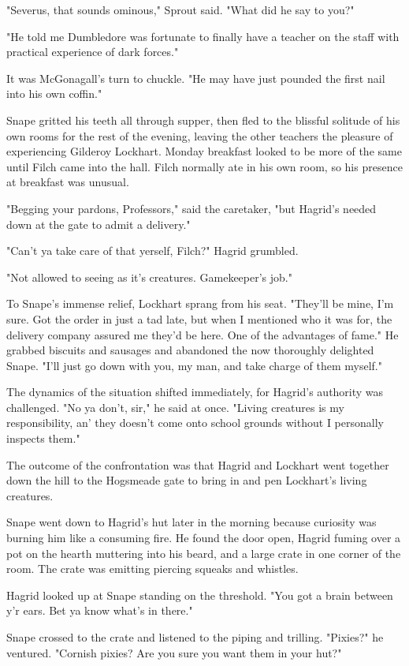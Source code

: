 \documentclass[a4paper,11pt]{article}
\begin{document}
"Severus, that sounds ominous," Sprout said. "What did he say to you?"

"He told me Dumbledore was fortunate to finally have a teacher on the staff with practical experience of dark forces."

It was McGonagall's turn to chuckle. "He may have just pounded the first nail into his own coffin."

Snape gritted his teeth all through supper, then fled to the blissful solitude of his own rooms for the rest of the evening, leaving the other teachers the pleasure of experiencing Gilderoy Lockhart. Monday breakfast looked to be more of the same until Filch came into the hall. Filch normally ate in his own room, so his presence at breakfast was unusual.

"Begging your pardons, Professors," said the caretaker, "but Hagrid's needed down at the gate to admit a delivery."

"Can't ya take care of that yerself, Filch?" Hagrid grumbled.

"Not allowed to seeing as it's creatures. Gamekeeper's job."

To Snape's immense relief, Lockhart sprang from his seat. "They'll be mine, I'm sure. Got the order in just a tad late, but when I mentioned who it was for, the delivery company assured me they'd be here. One of the advantages of fame." He grabbed biscuits and sausages and abandoned the now thoroughly delighted Snape. "I'll just go down with you, my man, and take charge of them myself."

The dynamics of the situation shifted immediately, for Hagrid's authority was challenged. "No ya don't, sir," he said at once. "Living creatures is my responsibility, an' they doesn't come onto school grounds without I personally inspects them."

The outcome of the confrontation was that Hagrid and Lockhart went together down the hill to the Hogsmeade gate to bring in and pen Lockhart's living creatures.

Snape went down to Hagrid's hut later in the morning because curiosity was burning him like a consuming fire. He found the door open, Hagrid fuming over a pot on the hearth muttering into his beard, and a large crate in one corner of the room. The crate was emitting piercing squeaks and whistles.

Hagrid looked up at Snape standing on the threshold. "You got a brain between y'r ears. Bet ya know what's in there."

Snape crossed to the crate and listened to the piping and trilling. "Pixies?" he ventured. "Cornish pixies? Are you sure you want them in your hut?"
\end{document}
